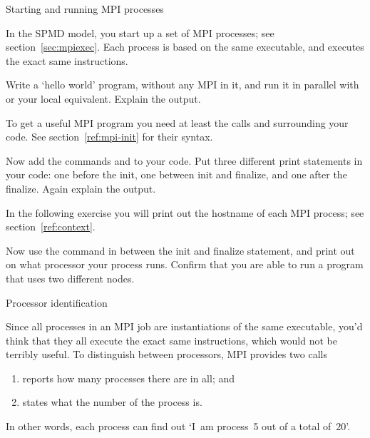  {Starting and running MPI processes}

In the \ac{SPMD} model, you start up a set of MPI processes; see section~\ref{sec:mpiexec}.
Each process is based on the same executable, and executes the exact same instructions.

\begin{exercise}
  \label{ex:hello1}
  Write a `hello world' program, without any MPI in it,
  and run it in parallel with  or your local equivalent. Explain the output.
\end{exercise}

To get a useful MPI program you need at least the calls 
and  surrounding your code. See section~\ref{ref:mpi-init}
for their syntax.

\begin{exercise}
  \label{ex:hello2}
  Now add the commands  and 
  to your code. Put three different print statements in your code: one before the init,
  one between init and finalize, and one after the finalize. Again explain the output.
\end{exercise}

In the following exercise you will print out the hostname
of each MPI process; see section~\ref{ref:context}.
\begin{exercise}
  \label{ex:procname}
  Now use the command 
  in between the
  init and finalize statement, and print out on what processor your process runs.
  Confirm that you are able to run a program that uses two different nodes.
\end{exercise}

 {Processor identification}

Since all processes in an MPI job are instantiations of the same executable,
you'd think that they all execute the exact same instructions,
which would not be terribly useful.
To distinguish between processors, MPI provides two calls
\begin{enumerate}
\item {} reports how many processes there are in all; and
\item {} states what the number of the process is.
\end{enumerate}
In other words, each process can find out `I~am process~5
out of a total of~20'.


